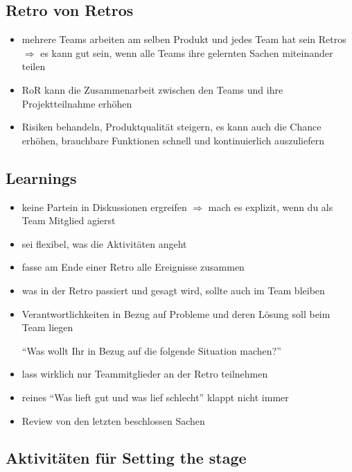 \subsection{Retro von Retros}

\begin{itemize}
  \item mehrere Teams arbeiten am selben Produkt und jedes Team hat sein Retros $\Rightarrow$  es
  kann gut sein, wenn alle Teams ihre gelernten Sachen miteinander teilen
  \item RoR kann die Zusammenarbeit zwischen den Teams und ihre Projektteilnahme erhöhen
  \item Risiken behandeln, Produktqualität steigern, es kann auch die Chance erhöhen, brauchbare
    Funktionen schnell und kontinuierlich auszuliefern
\end{itemize}


\subsection{Learnings}
\begin{itemize}
  \item keine Partein in Diskussionen ergreifen $\Rightarrow$  mach es explizit, wenn du als
    Team Mitglied agierst
  \item sei flexibel, was die Aktivitäten angeht
  \item fasse am Ende einer Retro alle Ereignisse zusammen
  \item was in der Retro passiert und gesagt wird, sollte auch im Team bleiben
  \item Verantwortlichkeiten in Bezug auf Probleme und deren Lösung soll beim Team liegen

    \enquote{Was wollt Ihr in Bezug auf die folgende Situation machen?}
  \item lass wirklich nur Teammitglieder an der Retro teilnehmen
  \item reines \enquote{Was lieft gut und was lief schlecht} klappt nicht immer
  \item Review von den letzten beschlossen Sachen
\end{itemize}


\subsection{Aktivitäten für Setting the stage}


